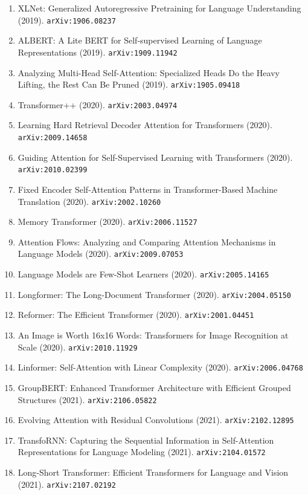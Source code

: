 \documentclass[11pt]{article}
\begin{document}
\begin{enumerate}
  Transformer (2019). \texttt{arXiv:1910.10683}
  \item XLNet: Generalized Autoregressive Pretraining for Language Understanding (2019). \texttt{arXiv:1906.08237}
  \item ALBERT: A Lite BERT for Self-supervised Learning of Language
  Representations (2019). \texttt{arXiv:1909.11942}
  \item Analyzing Multi-Head Self-Attention: Specialized Heads Do the Heavy
  Lifting, the Rest Can Be Pruned (2019). \texttt{arXiv:1905.09418}
  \item Transformer++ (2020). \texttt{arXiv:2003.04974}
  \item Learning Hard Retrieval Decoder Attention for Transformers (2020). \texttt{arXiv:2009.14658}
  \item Guiding Attention for Self-Supervised Learning with Transformers (2020). \texttt{arXiv:2010.02399}
  \item Fixed Encoder Self-Attention Patterns in Transformer-Based Machine
  Translation (2020). \texttt{arXiv:2002.10260}
  \item Memory Transformer (2020). \texttt{arXiv:2006.11527}
  \item Attention Flows: Analyzing and Comparing Attention Mechanisms in
  Language Models (2020). \texttt{arXiv:2009.07053}
  \item Language Models are Few-Shot Learners (2020). \texttt{arXiv:2005.14165}
  \item Longformer: The Long-Document Transformer (2020). \texttt{arXiv:2004.05150}
  \item Reformer: The Efficient Transformer (2020). \texttt{arXiv:2001.04451}
  \item An Image is Worth 16x16 Words: Transformers for Image Recognition at
  Scale (2020). \texttt{arXiv:2010.11929}
  \item Linformer: Self-Attention with Linear Complexity (2020). \texttt{arXiv:2006.04768}
  \item GroupBERT: Enhanced Transformer Architecture with Efficient Grouped
  Structures (2021). \texttt{arXiv:2106.05822}
  \item Evolving Attention with Residual Convolutions (2021). \texttt{arXiv:2102.12895}
  \item TransfoRNN: Capturing the Sequential Information in Self-Attention
  Representations for Language Modeling (2021). \texttt{arXiv:2104.01572}
  \item Long-Short Transformer: Efficient Transformers for Language and Vision (2021). \texttt{arXiv:2107.02192}

\end{enumerate}
\end{document}
